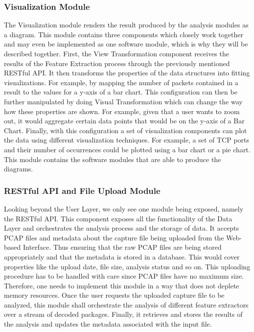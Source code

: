 \subsubsection{Visualization Module}
The Visualization module renders the result produced by the analysis modules as a diagram. This module contains three components which closely work together and may even be implemented as one software module, which is why they will be described together.
First, the View Transformation component receives the results of the Feature Extraction process through the previously mentioned RESTful API. It then transforms the properties of the data structures into fitting visualizations. For example, by mapping the number of packets contained in a result to the values for a y-axis of a bar chart.
This configuration can then be further manipulated by doing Visual Transformation which can change the way how these properties are shown. For example, given that a user wants to zoom out, it would aggregate certain data points that would be on the y-axis of a Bar Chart.
Finally, with this configuration a set of visualization components can plot the data using different visualization techniques. For example, a set of TCP ports and their number of occurrences could be plotted using a bar chart or a pie chart. This module contains the software modules that are able to produce the diagrams.

\subsubsection{RESTful API and File Upload Module}
Looking beyond the User Layer, we only see one module being exposed, namely the RESTful API. This component exposes all the functionality of the Data Layer and orchestrates the analysis process and the storage of data.
It accepts PCAP files and metadata about the capture file being uploaded from the Web-based Interface. Thus ensuring that the raw PCAP files are being stored appropriately and that the metadata is stored in a database. This would cover properties like the upload date, file size, analysis status and so on.
This uploading procedure has to be handled with care since PCAP files have no maximum size. Therefore, one needs to implement this module in a way that does not deplete memory resources.
Once the user requests the uploaded capture file to be analyzed, this module shall orchestrate the analysis of different feature extractors over a stream of decoded packages. Finally, it retrieves and stores the results of the analysis and updates the metadata associated with the input file.

